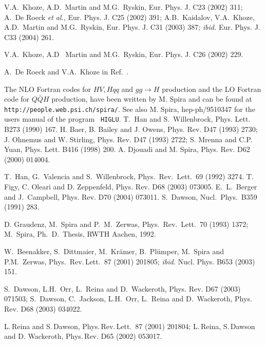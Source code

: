 \begin{thebibliography}{999}
V.A.~Khoze, A.D.~Martin and M.G.~Ryskin, Eur. Phys. J. C23 (2002) 311; 
A.~De Roeck {\it et al.}, Eur. Phys. J. C25 (2002) 391; 
A.B.~Kaidalov, V.A.~Khoze, A.D.~Martin and M.G.~Ryskin,  Eur. Phys. J. C31 
(2003) 387; {\it ibid.}  Eur. Phys. J. C33 (2004) 261. 

V.A.~Khoze, A.D ~Martin and M.G.~Ryskin, Eur. Phys. J. C26 (2002) 229.
 
 A.~De Roeck and  V.A.~Khoze in Ref.~\cite{Houches2003}.


 The NLO Fortran codes for $HV, Hqq$ and $gg \to H$ 
production and the LO Fortran code for $Q\bar Q H$ production, have been 
written by M. Spira and can be found at {\tt http://people.web.psi.ch/spira/}. 
See also M. Spira, hep-ph/9510347 for the users manual of the program {\tt 
HIGLU}.  
% 
 T.\ Han and S.\ Willenbrock, Phys. Lett. B273 (1990) 167.
%
H. Baer, B. Bailey and J. Owens, Phys. Rev. D47 (1993) 2730; J. Ohnemus 
and W. Stirling, Phys. Rev. D47 (1993) 2722; S. Mrenna and C.P. Yuan,
Phys. Lett. B416 (1998) 200.   
%
 A. Djouadi and M. Spira, Phys. Rev. D62 (2000) 014004.

 T.\ Han, G.\ Valencia and S.\ Willenbrock, Phys.\ Rev.\ 
Lett.\ 69 (1992) 3274.
%
 T. Figy, C. Oleari and D. Zeppenfeld, Phys. Rev. D68
(2003) 073005. 
%
 E.~L.~Berger and J.~Campbell, Phys. Rev. D70 (2004) 073011.
%
%
S.\ Dawson, Nucl.\ Phys.\ B359 (1991) 283. 

 D. Graudenz, M.~Spira and P.~M.~Zerwas, Phys.~Rev.~Lett.~70
(1993) 1372; M.\ Spira, Ph.\ D.\ Thesis, RWTH Aachen, 1992.

 W.~Beenakker, S.~Dittmaier, M.~Kr\"amer, 
B.~Pl\"umper, M.~Spira and P.M.~Zerwas, Phys.\, Rev.\,Lett.\, 87 (2001) 
201805; {\it ibid.} Nucl. Phys. B653 (2003) 151. 

 S.~Dawson, L.H.~Orr, L.~Reina and D.~Wackeroth, Phys. 
Rev. D67 (2003) 071503; S.~Dawson, C.~Jackson, L.H.~Orr, L.~Reina and 
D.~Wackeroth, Phys. Rev. D68 (2003) 034022.

L.\,Reina and S.\,Dawson, Phys.\,Rev.\,Lett.\, 87 (2001) 201804; 
L.\,Reina, S.\,Dawson and D. Wackeroth, Phys.\,Rev. D65 (2002) 053017. 


\end{thebibliography}
